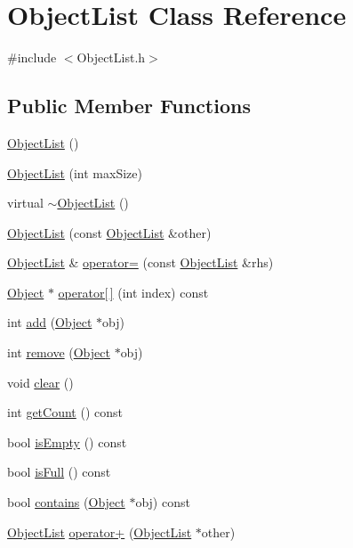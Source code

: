 \hypertarget{class_object_list}{\section{Object\+List Class Reference}
\label{class_object_list}
}


{\ttfamily \#include $<$Object\+List.\+h$>$}

\subsection*{Public Member Functions}
\begin{DoxyCompactItemize}
\item 
\hyperlink{class_object_list_ac22dc46c3b92c27106561eeb030329a2}{Object\+List} ()
\item 
\hyperlink{class_object_list_aea40931e016a9cc4391bb64f8182b81f}{Object\+List} (int max\+Size)
\item 
virtual \hyperlink{class_object_list_ac8d809647b3ac18b2369e827c3d56c19}{$\sim$\+Object\+List} ()
\item 
\hyperlink{class_object_list_a50d7d94ae804eb3010e44114bced2ab3}{Object\+List} (const \hyperlink{class_object_list}{Object\+List} \&other)
\item 
\hyperlink{class_object_list}{Object\+List} \& \hyperlink{class_object_list_a0abd0c5690e3fb72855df1df58390b6c}{operator=} (const \hyperlink{class_object_list}{Object\+List} \&rhs)
\item 
\hyperlink{class_object}{Object} $\ast$ \hyperlink{class_object_list_a214a707275b65f63efb80f05a10088e7}{operator\mbox{[}$\,$\mbox{]}} (int index) const 
\item 
int \hyperlink{class_object_list_a6be2936d67a42c0f7cce43f872b7234b}{add} (\hyperlink{class_object}{Object} $\ast$obj)
\item 
int \hyperlink{class_object_list_a57f7b3a7e7b78321ffe40c76cb6d12cb}{remove} (\hyperlink{class_object}{Object} $\ast$obj)
\item 
void \hyperlink{class_object_list_a0bd14ec3951fbd4a26760457848375ca}{clear} ()
\item 
int \hyperlink{class_object_list_a50674b1e0ffd4a87755e6debcd49d2d0}{get\+Count} () const 
\item 
bool \hyperlink{class_object_list_aa93162f07fc1bc3785cda41699beb37d}{is\+Empty} () const 
\item 
bool \hyperlink{class_object_list_a1ee2b0c6a6a2acb35f4c85e7b0c987e8}{is\+Full} () const 
\item 
bool \hyperlink{class_object_list_a6ac7d373e89715c761de1de41002d032}{contains} (\hyperlink{class_object}{Object} $\ast$obj) const 
\item 
\hyperlink{class_object_list}{Object\+List} \hyperlink{class_object_list_afb4ffe5ef4170a84eab8f5b819424dc4}{operator+} (\hyperlink{class_object_list}{Object\+List} $\ast$other)
\end{DoxyCompactItemize}
